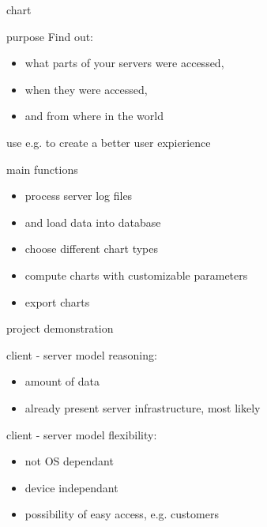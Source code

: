\documentclass[xcolor=dvipsnames]{beamer}
\begin{document}
\begin{frame}{chart}
\end{frame}

\begin{frame}{purpose}
	Find out:
	\begin{itemize}
		\item<1-> what parts of your servers were accessed,
		\item<2-> when they were accessed,
		\item<3-> and from where in the world
	\end{itemize}
	 {use e.g. to create a better user expierience}
\end{frame}

\begin{frame}{main functions}
	\begin{itemize}
	  \item<1-> process server log files
	  \item<1-> and load data into database
	  \item<2-> choose different chart types
	  \item<3-> compute charts with customizable parameters
	  \item<4-> export charts
	\end{itemize}
\end{frame}

\begin{frame}{}
	\begin{center}
	\huge{project demonstration}
	\end{center}
\end{frame}  

\begin{frame}{client - server model}
	reasoning:
	\begin{itemize}
	  \item<2-> amount of data
	  \item<3-> already present server infrastructure, most likely
	\end{itemize}
\end{frame}

\begin{frame}{client - server model}
	flexibility:
	\begin{itemize}
	  \item<2-> not OS dependant
	  \item<3-> device independant %
	  \item<4-> possibility of easy access, e.g. customers
	\end{itemize}
\end{frame}
\end{document}
